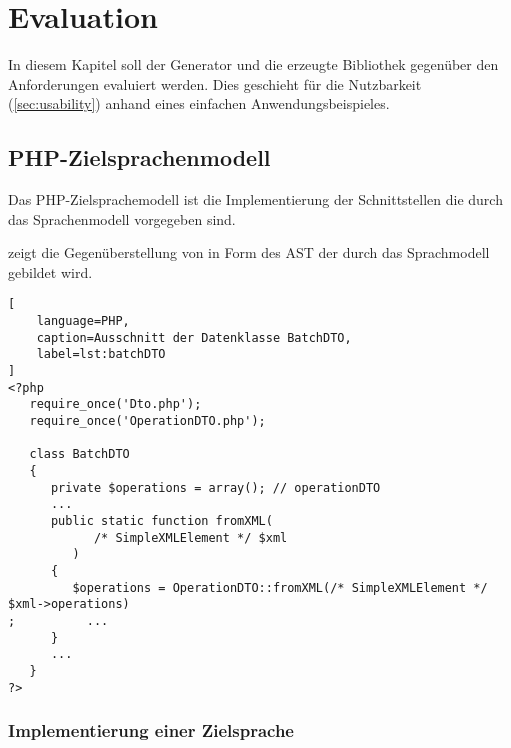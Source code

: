 \chapter{Evaluation}
\label{chap:evaluation}


In diesem Kapitel soll der Generator und die erzeugte Bibliothek gegenüber den Anforderungen evaluiert werden. Dies geschieht für die Nutzbarkeit (\cref{sec:usability}) anhand eines einfachen Anwendungsbeispieles.

\section{PHP-Zielsprachenmodell}\label{sec:php_target_language_model}

Das PHP-Zielsprachemodell ist die Implementierung der Schnittstellen die durch das Sprachenmodell vorgegeben sind.

 zeigt die Gegenüberstellung von  in Form des \gls{AST} der durch das Sprachmodell gebildet wird. 

\begin{minipage}{\textwidth}
\begin{lstlisting}[
    language=PHP,
    caption=Ausschnitt der Datenklasse BatchDTO,
    label=lst:batchDTO
]
<?php
   require_once('Dto.php');
   require_once('OperationDTO.php');

   class BatchDTO
   {
      private $operations = array(); // operationDTO 
      ...
      public static function fromXML(
            /* SimpleXMLElement */ $xml
         )
      {
         $operations = OperationDTO::fromXML(/* SimpleXMLElement */ $xml->operations)
;          ...
      }
      ...
   }
?>
\end{lstlisting}
\end{minipage}

\begin{sidewaysfigure}
    \centering
    \resizebox{\textwidth}{!}{
      
    }
    \caption{Darstellung von BatchDTO aus  im Sprachenmodell [\textbf{Klasse}, \emph{Zeichenkette}]}
    \label{fig:modelRepresentationOfBatchDTO}
\end{sidewaysfigure}

\subsection{Implementierung einer Zielsprache}
\label{sec:target_language_implementation}


